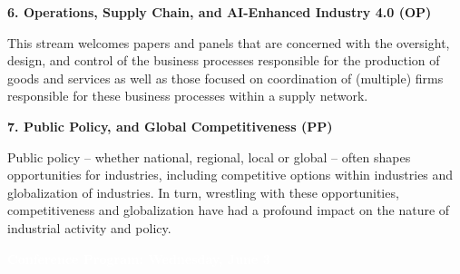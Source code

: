 \documentclass[
  10pt,
  letterpaper,
  DIV=11,
  numbers=noendperiod]{scrartcl}
\begin{document}
\vspace{1em}

\noindent\textbf{\textcolor{operations}{6. Operations, Supply Chain, and AI-Enhanced Industry 4.0 (OP)}}

\vspace{0.3em}
\noindent This stream welcomes papers and panels that are concerned with the oversight, design, and control of the business processes responsible for the production of goods and services as well as those focused on coordination of (multiple) firms responsible for these business processes within a supply network.

\vspace{1em}

\noindent\textbf{\textcolor{policy}{7. Public Policy, and Global Competitiveness (PP)}}

\vspace{0.3em}
\noindent Public policy -- whether national, regional, local or global -- often shapes opportunities for industries, including competitive options within industries and globalization of industries. In turn, wrestling with these opportunities, competitiveness and globalization have had a profound impact on the nature of industrial activity and policy.

\newpage

\markboth{}{}
\noindent\colorbox{event}{\parbox{\dimexpr\linewidth-2\fboxsep}{\centering\textcolor{white}{\large\textbf{Conference Program: Wednesday, June 3}}}}

\vspace{0.6em}
\end{document}
